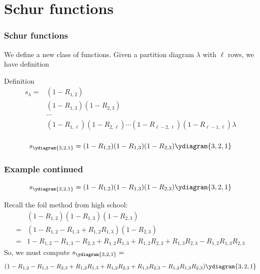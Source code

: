 \documentclass{beamer}
\begin{document}
\section{Schur functions}
\begin{frame}
  \frametitle{Schur functions}
  We define a new class of functions. Given a partition diagram
  \(\lambda\) with 
  \(\ell\) rows, we have definition \pause
  \begin{block}{Definition}
    \begin{align*}
      s_\lambda = &(1-R_{1,2})\\
                  &(1-R_{1,3})(1-R_{2,3})\\
                  & \cdots\\
                  &(1-R_{1,
                    \ell})(1-R_{2,\ell})\cdots(1-R_{\ell-2,\ell})(1-R_{\ell-1,\ell})
                    \lambda\\
    \end{align*}
  \end{block}
  \pause
    \begin{example}
      \[
        s_{\ydiagram{3,2,1}} = (1-R_{1,2})(1-R_{1,3})(1-R_{2,3})
        \ydiagram{3,2,1}
      \]
    \end{example}
\end{frame}
\begin{frame}
  \frametitle{Example continued}
    \begin{example}
    \[
      s_{\ydiagram{3,2,1}} = (1-R_{1,2})(1-R_{1,3})(1-R_{2,3})
      \ydiagram{3,2,1}
    \]
  \end{example}\pause
  Recall the foil method from high school:
  \begin{align*}
    &(1-R_{1,2})(1-R_{1,3})(1-R_{2,3}) \\
     = &(1-R_{1,2}-R_{1,3}+R_{1,2}R_{1,3})(1-R_{2,3}) \\
     = &1-R_{1,2}-R_{1,3}-R_{2,3}+R_{1,2}R_{1,3}+R_{1,2}R_{2,3}+R_{1,3}R_{2,3}-R_{1,2}R_{1,3}R_{2,3}
  \end{align*}\pause
  So, we must compute \(s_{\ydiagram{3,2,1}} = \)\[
    (1-R_{1,2}-R_{1,3}-R_{2,3}+R_{1,2}R_{1,3}+R_{1,2}R_{2,3}+R_{1,3}R_{2,3}-R_{1,2}R_{1,3}R_{2,3})\ydiagram{3,2,1}
  \]
\end{frame}
\end{document}

